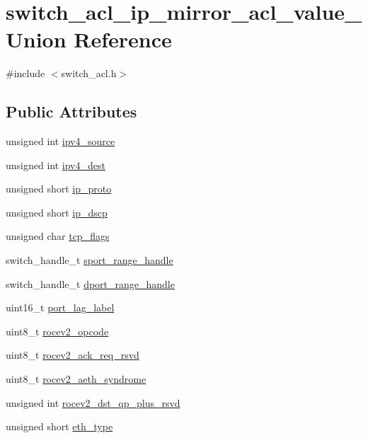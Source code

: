 \hypertarget{unionswitch__acl__ip__mirror__acl__value__}{\section{switch\+\_\+acl\+\_\+ip\+\_\+mirror\+\_\+acl\+\_\+value\+\_\+ Union Reference}
\label{unionswitch__acl__ip__mirror__acl__value__}
}


{\ttfamily \#include $<$switch\+\_\+acl.\+h$>$}

\subsection*{Public Attributes}
\begin{DoxyCompactItemize}
\item 
unsigned int \hyperlink{unionswitch__acl__ip__mirror__acl__value___abc38dcd290c8bbbabb8c86f9fd964d94}{ipv4\+\_\+source}
\item 
unsigned int \hyperlink{unionswitch__acl__ip__mirror__acl__value___af5f4c8c75de32d54a12bf0a46c0d39ba}{ipv4\+\_\+dest}
\item 
unsigned short \hyperlink{unionswitch__acl__ip__mirror__acl__value___adb0f6eeda8aef3fb5bcd2367fa4ca330}{ip\+\_\+proto}
\item 
unsigned short \hyperlink{unionswitch__acl__ip__mirror__acl__value___aff00ebdb9532c8ae25789233a4c7f064}{ip\+\_\+dscp}
\item 
unsigned char \hyperlink{unionswitch__acl__ip__mirror__acl__value___a1e57ecd28ae076064b62cf57c4529c86}{tcp\+\_\+flags}
\item 
switch\+\_\+handle\+\_\+t \hyperlink{unionswitch__acl__ip__mirror__acl__value___a847940f7ad65208c02b55f9946e97f98}{sport\+\_\+range\+\_\+handle}
\item 
switch\+\_\+handle\+\_\+t \hyperlink{unionswitch__acl__ip__mirror__acl__value___a5683ae0cc159233f6c7fe5c7e904c0f8}{dport\+\_\+range\+\_\+handle}
\item 
uint16\+\_\+t \hyperlink{unionswitch__acl__ip__mirror__acl__value___a1a2f2218de328d2c026d131cdd80aead}{port\+\_\+lag\+\_\+label}
\item 
uint8\+\_\+t \hyperlink{unionswitch__acl__ip__mirror__acl__value___af6e2b30b03947ea60a21ec1e9d20d29e}{rocev2\+\_\+opcode}
\item 
uint8\+\_\+t \hyperlink{unionswitch__acl__ip__mirror__acl__value___aa416c113a34f18099a541aa163f4c3db}{rocev2\+\_\+ack\+\_\+req\+\_\+rsvd}
\item 
uint8\+\_\+t \hyperlink{unionswitch__acl__ip__mirror__acl__value___abb646abf701b1407ee1d597607ce5cc3}{rocev2\+\_\+aeth\+\_\+syndrome}
\item 
unsigned int \hyperlink{unionswitch__acl__ip__mirror__acl__value___ac53f632c77502346dd278c96c54f8454}{rocev2\+\_\+dst\+\_\+qp\+\_\+plus\+\_\+rsvd}
\item 
unsigned short \hyperlink{unionswitch__acl__ip__mirror__acl__value___a5562904d79932785514814c07918ae4a}{eth\+\_\+type}
\end{DoxyCompactItemize}


